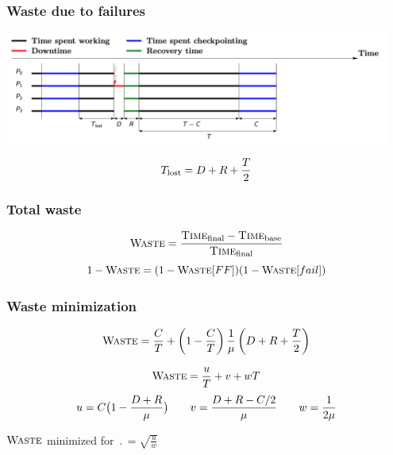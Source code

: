 \begin{frame}
    \frametitle{Waste due to failures}
    
\begin{center}
\includegraphics[width=0.95\textwidth]{NewYvesCoordinated.png}
\end{center}
$$\Tlost= \D+\R+ \frac{\period}{2}$$
  


\end{frame}

\begin{frame}
  \frametitle{Total waste}
 
\centering


$$\Waste= \frac{\Time[final]-\Time[base]}{\Time[final]}$$
$$1 - \Waste = (1-\Waste[FF])(1-\Waste[fail])$$

\end{frame}

\begin{frame}
  \frametitle{Waste minimization}
 

$$\Waste = \frac{\Cr}{\period} + \left( 1 -  \frac{\Cr}{\period} \right) 
	\frac{1}{\mu} \left( \D + \R + \frac{\period}{2} \right)$$


$$\Waste =  \frac{u}{\period} + v + w \period$$
$$u=\Cr \big( 1 - \frac{\D+\R}{\mu} \big) \qquad v =  \frac{\D+\R- \Cr/2}{\mu} \qquad w= \frac{1}{2\mu}$$


\vfill
\noindent
$\Waste$  minimized for $\period = \sqrt{\frac{u}{w}}$



\end{frame}


